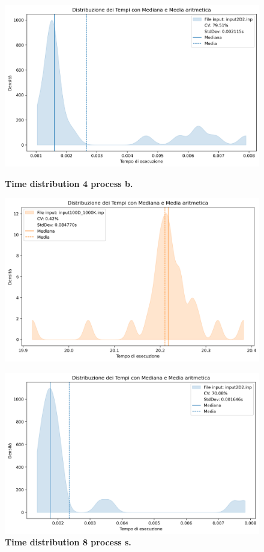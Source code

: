 \documentclass{article}
\begin{document}
\begin{figure}[ht]
\begin{minipage}{0.45\textwidth}
      \includegraphics[width=\linewidth]{../test_csv/plots/time_distribution/time_distribution_2D2_omp_mpi_4.png}
      \label{time_d_4_small}
    \end{minipage}
    \begin{minipage}{0.45\textwidth}
      \centering
      \caption{\textbf{Time distribution 4 process b.}}
      \includegraphics[width=\linewidth]{../test_csv/plots/time_distribution/time_distribution_100D_1000K_omp_mpi_4.png}
      \label{time_d_4_big}
    \end{minipage}
    \begin{minipage}{0.45\textwidth}
      \centering
      \caption{\textbf{Time distribution 8 process s.}}
      \includegraphics[width=\linewidth]{../test_csv/plots/time_distribution/time_distribution_2D2_omp_mpi_8.png}

\end{minipage}
\end{figure}
\end{document}
